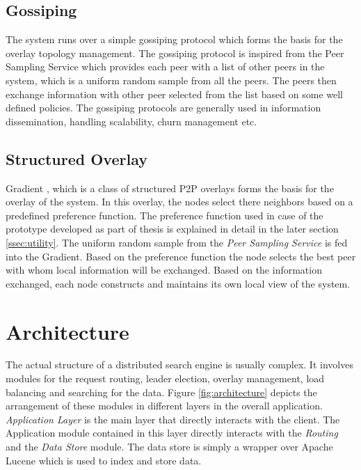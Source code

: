 \documentclass[a4paper,11pt]{kth-mag}
\begin{document}
\subsection{Gossiping}
The system runs over a simple gossiping protocol which forms the basis for the overlay topology management. The gossiping protocol is inspired from the Peer Sampling Service \cite{samplingService} which provides each peer with a list of other peers in the system,  which is a uniform random sample from all the peers. The peers then exchange information with other peer selected from the list based on some well defined policies. The gossiping protocols are generally used in information dissemination, handling scalability, churn management etc.


\subsection{Structured Overlay}

Gradient \cite{sacha2006discovery}, which is a class of structured P2P overlays forms the basis for the overlay of the system. In this overlay, the nodes select there neighbors based on a predefined preference function. The preference function used in case of the prototype developed as part of thesis is explained in detail in the later section \ref{ssec:utility}. The uniform random sample from the \textit{Peer Sampling Service} is fed into the Gradient. Based on the preference function the node selects the best peer with whom local information will be exchanged. Based on the information exchanged, each node constructs and maintains its own local view of the system.


\section{Architecture}
\label{sec:architecture}

The actual structure of a distributed search engine is usually complex. It involves modules for the request routing, leader election, overlay management, load balancing and searching for the data. Figure \ref{fig:architecture} depicts the arrangement of these modules in different layers in the overall application. \textit{Application Layer} is the main layer that directly interacts with the client. The Application module contained in this layer directly interacts with the \textit{Routing} and the \textit{Data Store} module. The data store is simply a wrapper over Apache Lucene which is used to index and store data.
\end{document}
